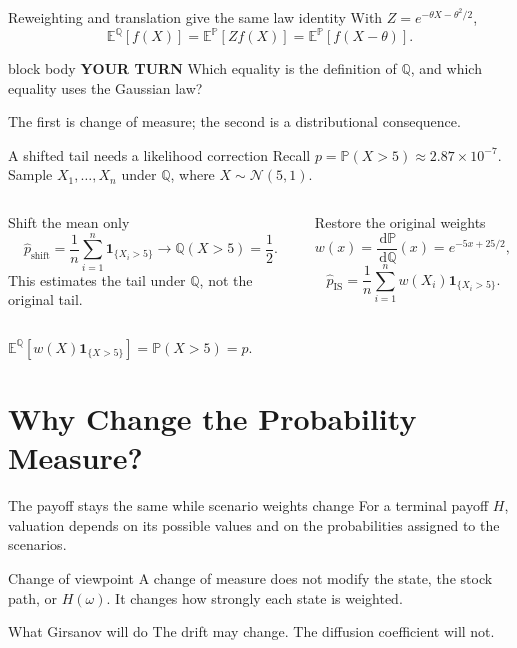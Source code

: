 \documentclass[handout,10pt,aspectratio=169]{beamer}
\newenvironment{pausebox}{\begin{beamercolorbox}[rounded=true,sep=0.8em,wd=\textwidth]{block body}
  \textbf{\color{CourseGold}YOUR TURN}\quad}{\end{beamercolorbox}}
\newcommand{\dd}{\,\mathrm d}
\newcommand{\E}{\mathbb E}
\newcommand{\Pp}{\mathbb P}
\newcommand{\Q}{\mathbb Q}
\newcommand{\1}{\mathbf 1}
\newcommand{\Nlaw}{\mathcal N}
\begin{document}
\begin{frame}{Reweighting and translation give the same law identity}
With \(Z=e^{-\theta X-\theta^2/2}\),
\[
\boxed{
\E^\Q[f(X)]
=\E^\Pp[Zf(X)]
=\E^\Pp[f(X-\theta)].}
\]
\begin{pausebox}
Which equality is the definition of \(\Q\), and which equality uses the
Gaussian law?
\end{pausebox}

The first is change of measure; the second is a distributional consequence.
\end{frame}

\begin{frame}{A shifted tail needs a likelihood correction}
Recall \(p=\Pp(X>5)\approx2.87\times10^{-7}\). Sample
\(X_1,\ldots,X_n\) under \(\Q\), where \(X\sim\Nlaw(5,1)\).
\begin{columns}[T,onlytextwidth]
\begin{alertblock}{Shift the mean only}
\[
\widehat p_{\mathrm{shift}}
=\frac1n\sum_{i=1}^n\1_{\{X_i>5\}}
\longrightarrow \Q(X>5)=\frac12.
\]
This estimates the tail under \(\Q\), not the original tail.
\end{alertblock}
\begin{exampleblock}{Restore the original weights}
\[
w(x)=\frac{\dd\Pp}{\dd\Q}(x)
=e^{-5x+25/2},
\]
\[
\widehat p_{\mathrm{IS}}
=\frac1n\sum_{i=1}^n w(X_i)\1_{\{X_i>5\}}.
\]
\end{exampleblock}
\end{columns}
\medskip
\centering\(\boxed{\E^\Q[w(X)\1_{\{X>5\}}]=\Pp(X>5)=p.}\)
\end{frame}



\section{Why Change the Probability Measure?}

\begin{frame}{The payoff stays the same while scenario weights change}
For a terminal payoff \(H\), valuation depends on its possible values and on
the probabilities assigned to the scenarios.
\begin{exampleblock}{Change of viewpoint}
A change of measure does not modify the state, the stock path, or \(H(\omega)\).
It changes how strongly each state is weighted.
\end{exampleblock}
\begin{alertblock}{What Girsanov will do}
The drift may change. The diffusion coefficient will not.
\end{alertblock}
\end{frame}
\end{document}
